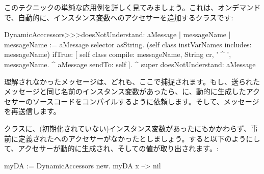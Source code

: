 \documentclass[a4paper,10pt,twoside]{book}
\begin{document}

このテクニックの単純な応用例を詳しく見てみましょう。これは、オンデマンドで、自動的に、インスタンス変数へのアクセサーを追加するクラスです: %

\begin{code}{}
DynamicAcccessors>>>doesNotUnderstand: aMessage
	| messageName |
	messageName := aMessage selector asString.
	(self class instVarNames includes: messageName)
		ifTrue: [
			self class compile: messageName, String cr, ' ^ ', messageName.
			^ aMessage sendTo: self ].
	^ super doesNotUnderstand: aMessage
\end{code}
理解されなかったメッセージは、どれも、ここで捕捉されます。もし、送られたメッセージと同じ名前のインスタンス変数があったら、に、動的に生成したアクセサーのソースコードをコンパイルするように依頼します。そして、メッセージを再送信します。

クラスに、(初期化されていない)インスタンス変数があったにもかかわらず、事前に定義されたへのアクセサーがなかったとしましょう。すると以下のようにして、アクセサーが動的に生成され、そしての値が取り出されます。:
\begin{code}{}
myDA := DynamicAccessors new.
myDA x --> nil
\end{code}
\end{document}
